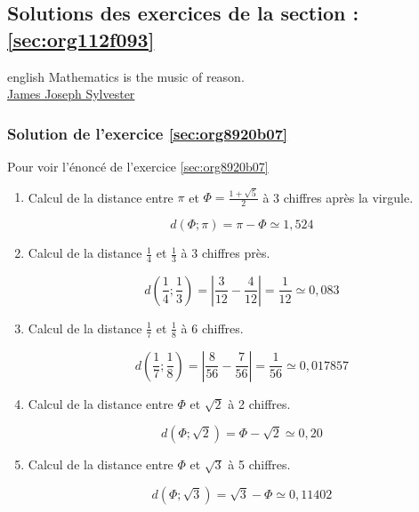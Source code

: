 \documentclass[a4paper, 11pt, twoside]{article}
\begin{document}
\subsection{Solutions des exercices de la section : \ref{sec:org112f093}}
\label{sec:org95af6d2}

\begin{foreigndisplayquote}{english}
Mathematics is the music of reason.\\

\href{https://en.wikipedia.org/wiki/James\_Joseph\_Sylvester}{James Joseph Sylvester}
\end{foreigndisplayquote}

\startcontents[level-2]

\subsubsection{Solution de l'exercice \ref{sec:org8920b07}}
\label{sec:org1740f2d}
Pour voir l'énoncé de l'exercice \ref{sec:org8920b07}

\begin{enumerate}
\item Calcul de la distance entre \(\pi\) et \(\Phi = \frac{1 +
       \sqrt{5}}{2}\) à 3 chiffres après la virgule.

\[d(\Phi ; \pi) = \pi - \Phi \simeq 1,524\]

\item Calcul de la distance \(\frac{1}{4}\) et \(\frac{1}{3}\) à 3
chiffres près.

\[d\left(\frac{1}{4} ; \frac{1}{3}\right) =
       \left\lvert\frac{3}{12} - \frac{4}{12}\right\rvert =
       \frac{1}{12} \simeq 0,083\]

\item Calcul de la distance \(\frac{1}{7}\) et \(\frac{1}{8}\) à 6
chiffres.

\[d\left(\frac{1}{7} ; \frac{1}{8}\right) =
       \left\lvert\frac{8}{56} - \frac{7}{56}\right\rvert =
       \frac{1}{56} \simeq 0,017857\]

\item Calcul de la distance entre \(\Phi\) et \(\sqrt{2}\) à 2 chiffres.

\[d\left(\Phi ; \sqrt{2}\right) = \Phi - \sqrt{2} \simeq 0,20\]

\item Calcul de la distance entre \(\Phi\) et \(\sqrt{3}\) à 5 chiffres.

\[d\left(\Phi ; \sqrt{3}\right) = \sqrt{3} - \Phi \simeq 0,11402\]
\end{enumerate}
\end{document}
